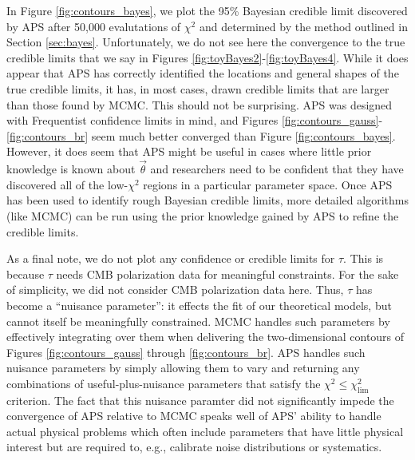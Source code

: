 \documentclass[useAMS,usenatbib]{aastex}
\begin{document}
In Figure \ref{fig:contours_bayes}, we plot the 95\% Bayesian credible limit discovered
by APS after 50,000 evalutations of $\chi^2$ and determined by the method outlined in
Section \ref{sec:bayes}.  Unfortunately, we do not see here the convergence to the true
credible limits that we say in Figures \ref{fig:toyBayes2}-\ref{fig:toyBayes4}.  While
it does appear that APS has correctly identified the locations and general shapes of the
true credible limits, it has, in most cases, drawn credible limits that are larger than
those found by MCMC.  This should not be surprising.  APS was designed with Frequentist
confidence limits in mind, and Figures \ref{fig:contours_gauss}-\ref{fig:contours_br}
seem much better converged than Figure \ref{fig:contours_bayes}.  However, it does seem
that APS might be useful in cases where little prior knowledge is known about $\vec{\theta}$
and researchers need to be confident that they have discovered all of the low-$\chi^2$
regions in a particular parameter space.  Once APS has been used to identify rough
Bayesian credible limits, more detailed algorithms (like MCMC) can be run using the prior
knowledge gained by APS to refine the credible limits.

As a final note, we do not plot any confidence or 
credible limits for $\tau$.
This is because $\tau$ needs CMB polarization data for meaningful constraints.  For the sake
of simplicity, we did not consider CMB polarization data here.  Thus, $\tau$ has become a
``nuisance parameter'': it effects the fit of our theoretical models, but cannot itself be
meaningfully constrained.  MCMC handles such parameters by effectively integrating over them
when delivering the two-dimensional contours of Figures
\ref{fig:contours_gauss} through \ref{fig:contours_br}.  
APS handles such nuisance parameters by
simply allowing them to vary and returning any combinations of useful-plus-nuisance parameters
that satisfy the $\chi^2\le\chi^2_\text{lim}$ criterion.  The fact that this nuisance
paramter did not significantly impede the convergence of APS relative to MCMC speaks 
well of
APS' ability to handle actual physical problems which 
often include parameters that have
little physical interest but are required to, e.g., 
calibrate noise distributions or
systematics.
\end{document}
